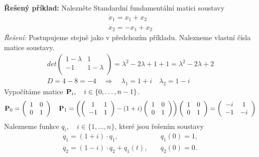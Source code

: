 {\bf Řešený příklad:}\newline %
Nalezněte Standardní fundamentální matici soustavy
\begin{equation*}
\begin{array}{c}
 \dot{x}_1 = x_1 + x_2\\
 \dot{x}_2 = -x_1 + x_2
\end{array}
\end{equation*}
{\it Řešení:}\newline 
Postupujeme stejně jako v předchozím příkladu. Nalezneme vlastní čísla matice soustavy.
\begin{equation*}
 \begin{array}{c}
  det\left( \begin{array}{cc} 1-\lambda & 1\\ -1 & 1-\lambda\\ \end{array}\right) = \lambda^2 - 2\lambda + 1 + 1 = \lambda^2 - 2\lambda + 2 \\
  D = 4 - 8 = -4 \quad\Rightarrow\quad\lambda_1 = 1+i\quad\lambda_2 = 1-i
  \end{array}
\end{equation*}
Vypočítáme matice ${\bf P}_i,\quad i \in \{0,\ldots,n-1\}$.
\begin{equation*}
 {\bf P}_0 = \left(\begin{array}{cc} 1 & 0\\ 0 & 1\end{array}\right)\quad {\bf P}_1 = \left(\left( \begin{array}{cc} 1 & 1 \\ -1 & 1 \end{array}\right) - (1+i)\left( \begin{array}{cc} 1 & 0\\ 0 & 1 \end{array}\right)\right)\left(\begin{array}{cc} 1 & 0\\ 0 & 1\end{array}\right) = \left( \begin{array}{cc} -i & 1\\ -1 & -i\end{array}\right)
\end{equation*}
Nalezneme funkce $q_i,\quad i \in\{1,\ldots,n\}$, které jsou řešením soustavy
\begin{equation*}
 \begin{array}{cc}
  \dot{q}_1 = (1 + i)\cdot q_1,&\quad q_1(0) = 1,\\
  \dot{q}_2 = (1 - i)\cdot q_2 + q_1(t),&\quad q_2(0) = 0.
 \end{array}
\end{equation*}
